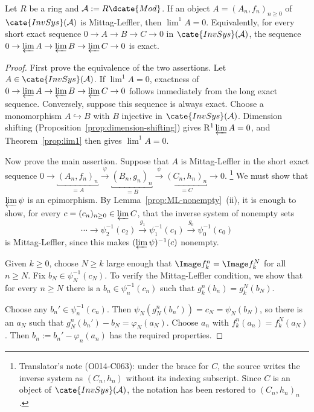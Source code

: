 \begin{proposition}\label{prop:ML-exactness}
	Let $R$ be a ring and $\mathcal{A}:=R\dcate{Mod}$. If an object
	$A=(A_n,f_n)_{n\geq0}$ of $\cate{InvSys}(\mathcal{A})$ is
	Mittag-Leffler, then $\lim^1A=0$. Equivalently, for every short exact
	sequence $0\to A\to B\to C\to0$ in $\cate{InvSys}(\mathcal{A})$, the
	sequence
	$0\to\varprojlim A\to\varprojlim B\to\varprojlim C\to0$ is exact.
\end{proposition}
\begin{proof}
	First prove the equivalence of the two assertions. Let
	$A\in\cate{InvSys}(\mathcal{A})$. If $\lim^1A=0$, exactness of
	$0\to\varprojlim A\to\varprojlim B\to\varprojlim C\to0$ follows
	immediately from the long exact sequence. Conversely, suppose this sequence
	is always exact. Choose a monomorphism $A\hookrightarrow B$ with $B$
	injective in $\cate{InvSys}(\mathcal{A})$. Dimension shifting
	(Proposition~\ref{prop:dimension-shifting}) gives
	$\mathrm{R}^1\varprojlim A=0$, and Theorem~\ref{prop:lim1} then gives
	$\lim^1A=0$.

	Now prove the main assertion. Suppose that $A$ is Mittag-Leffler in the
	short exact sequence
	$0\to\underbracket{(A_n,f_n)_n}_{=A}\xrightarrow{\varphi}
	\underbracket{(B_n,g_n)_n}_{=B}\xrightarrow{\psi}
	\underbracket{(C_n,h_n)_n}_{=C}\to0$.
	\footnote{Translator's note (O014-C063): under the brace for $C$, the
	source writes the inverse system as $(C_n,h_n)$ without its indexing
	subscript. Since $C$ is an object of $\cate{InvSys}(\mathcal{A})$, the
	notation has been restored to $(C_n,h_n)_n$.}
	We must show that $\varprojlim\psi$ is an epimorphism. By
	Lemma~\ref{prop:ML-nonempty}~(ii), it is enough to show, for every
	$c=(c_n)_{n\geq0}\in\varprojlim C$, that the inverse system of nonempty
	sets
	\[ \cdots \to \psi_2^{-1}(c_2) \xrightarrow{g_1} \psi_1^{-1}(c_1) \xrightarrow{g_0} \psi_0^{-1}(c_0) \]
	is Mittag-Leffler, since this makes $(\varprojlim\psi)^{-1}(c)$ nonempty.

	Given $k\geq0$, choose $N\geq k$ large enough that
	$\Image f_k^n=\Image f_k^N$ for all $n\geq N$. Fix
	$b_N\in\psi_N^{-1}(c_N)$. To verify the Mittag-Leffler condition, we show
	that for every $n\geq N$ there is a $b_n\in\psi_n^{-1}(c_n)$ such that
	$g_k^n(b_n)=g_k^N(b_N)$.

	Choose any $b_n'\in\psi_n^{-1}(c_n)$. Then
	$\psi_N(g_N^n(b_n'))=c_N=\psi_N(b_N)$, so there is an $a_N$ such that
	$g_N^n(b_n')-b_N=\varphi_N(a_N)$. Choose $a_n$ with
	$f_k^n(a_n)=f_k^N(a_N)$. Then $b_n:=b_n'-\varphi_n(a_n)$ has the required
	properties.
\end{proof}

